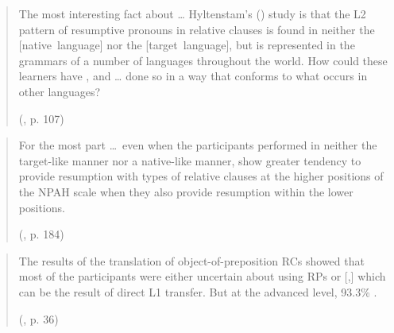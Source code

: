 \begin{quote}\begin{samepage}
The most interesting fact about \dots{} Hyltenstam's (\citeyear{hyltenstam1984}) study is that the L2 pattern of resumptive pronouns in relative clauses is found in neither the [native~language] nor the [target~language], but is represented in the grammars of a number of languages throughout the world. How could these learners have  , and \dots{} done so in a way that conforms to what occurs in other languages?
\par\nobreak\vspace{5pt}
\hfill(\cite{eckman2004}, p. 107)        
\end{samepage}\end{quote}\vspace{-12pt}

\begin{quote}\begin{samepage}
For the most part \dots~even when the participants performed in neither the target-like manner nor a native-like manner,  show greater tendency to provide resumption with types of relative clauses at the higher positions of the NPAH scale when they also provide resumption within the lower positions.
\par\nobreak\vspace{5pt}
\hfill(\cite{algady2013}, p. 184)        
\end{samepage}\end{quote}\vspace{-12pt}

\begin{quote}\begin{samepage}
The results of the translation of object-of-preposition RCs showed that most of the participants were either uncertain about using RPs or [,] which can be the result of direct L1 transfer. But at the advanced level, 93.3\% .
\par\nobreak\vspace{5pt}
\hfill(\cite{marefat.abdollahnejad2014}, p. 36)        
\end{samepage}\end{quote}\vspace{-12pt}

